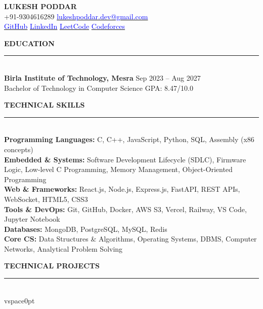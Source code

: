 \documentclass[10pt,letterpaper]{article}
\begin{document}
\begin{center}
{\LARGE \textbf{LUKESH PODDAR}}\\[3pt]
+91-9304616289 \hspace{10pt}\href{mailto:lukeshpoddar.dev@gmail.com}{\textcolor{blue}{lukeshpoddar.dev@gmail.com}}\\[1pt]
\href{https://github.com/TechieLukesh}{\textcolor{blue}{GitHub}}
\hspace{10pt}
\href{https://www.linkedin.com/in/lukeshpoddar/}{\textcolor{blue}{LinkedIn}}
\hspace{10pt}\href{https://leetcode.com/u/xvariant/}{\textcolor{blue}{LeetCode}}
\hspace{10pt}
\href{https://codeforces.com/profile/xvariant}{\textcolor{blue}{Codeforces}}
\end{center}

\vspace{0pt}

\noindent\textbf{EDUCATION}\\[-5pt]
\rule{\textwidth}{0.4pt}\\[1pt]
\textbf{Birla Institute of Technology, Mesra} \hfill Sep 2023 -- Aug 2027\\
Bachelor of Technology in Computer Science \hfill GPA: 8.47/10.0

\vspace{2pt}

\noindent\textbf{TECHNICAL SKILLS}\\[-5pt]
\rule{\textwidth}{0.4pt}\\[1pt]
\textbf{Programming Languages:} C, C++, JavaScript, Python, SQL, Assembly (x86 concepts)\\
\textbf{Embedded \& Systems:} Software Development Lifecycle (SDLC), Firmware Logic, Low-level C Programming, Memory Management, Object-Oriented Programming\\
\textbf{Web \& Frameworks:} React.js, Node.js, Express.js, FastAPI, REST APIs, WebSocket, HTML5, CSS3\\
\textbf{Tools \& DevOps:} Git, GitHub, Docker, AWS S3, Vercel, Railway, VS Code, Jupyter Notebook\\
\textbf{Databases:} MongoDB, PostgreSQL, MySQL, Redis\\
\textbf{Core CS:} Data Structures \& Algorithms, Operating Systems, DBMS, Computer Networks, Analytical Problem Solving

\vspace{2pt}

\noindent\textbf{TECHNICAL PROJECTS}\\[-5pt]
\rule{\textwidth}{0.4pt}\\vspace{0pt}
\end{document}
